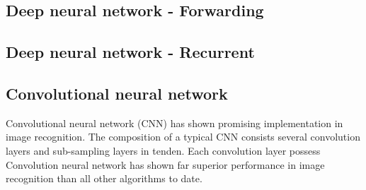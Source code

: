 \subsection{Deep neural network - Forwarding}
\subsection{Deep neural network - Recurrent}
\subsection{Convolutional neural network}
Convolutional neural network (CNN) has shown promising implementation in image recognition. The composition of a typical CNN consists several convolution layers and sub-sampling layers in tenden. Each convolution layer possess 
Convolution neural network has shown far superior performance in image recognition than all other algorithms to date.~\cite{Szegedy_2015}